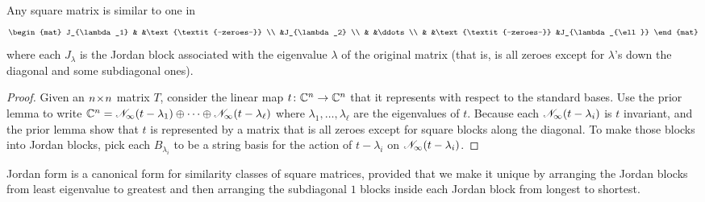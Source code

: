\begin{theorem}
Any square matrix is similar to one in 
\begin{equation*}
  \begin{mat}
    J_{\lambda_1}  &            &\text{\textit{--zeroes--}}                 \\
               &J_{\lambda_2}                                              \\
               &     &\ddots                                     \\
               &     &\text{\textit{--zeroes--}} &J_{\lambda_{\ell}}
  \end{mat}
\end{equation*}
where each \( J_{\lambda} \) is the Jordan block associated with the
eigenvalue $\lambda$ of the original matrix (that is, is all zeroes except for
\( \lambda \)'s down the diagonal and some subdiagonal ones).
\end{theorem}

\begin{proof}
Given an \( n \! \times \! n \) matrix \( T \), consider the linear map
\( \mbox{$t\colon \mathbb{C}^n\to \mathbb{C}^n$} \) that it represents
with respect to the standard bases.
Use the prior lemma to write
\( \mathbb{C}^n=\mathscr{N}_\infty(t-\lambda_1)\oplus\cdots
        \oplus\mathscr{N}_\infty(t-\lambda_\ell) \)
where \( \lambda_1,\ldots,\lambda_\ell \) are the eigenvalues of \( t \).
Because each \( \mathscr{N}_\infty(t-\lambda_i) \)  is \( t \) invariant,
 and the prior lemma show
that \( t \) is represented by a matrix that is all zeroes except for square
blocks along the diagonal.
To make those blocks into Jordan blocks, pick each \( B_{\lambda_i} \)
to be a string basis for the action of \( t-\lambda_i \) on
\( \mathscr{N}_\infty(t-\lambda_i) \). 
\end{proof}

Jordan form is a canonical form for similarity classes of square
matrices,
provided that we make it unique by arranging the
Jordan blocks from least eigenvalue to greatest and then
arranging the subdiagonal $1$ blocks inside each Jordan block from 
longest to shortest.

